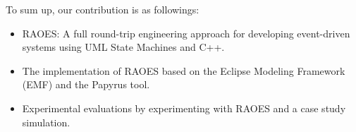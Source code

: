 To sum up, our contribution is as followings:
\begin{itemize}
	\item RAOES: A full round-trip engineering approach for developing event-driven systems using UML State Machines and C++.
	\item The implementation of RAOES based on the Eclipse Modeling Framework (EMF) and the Papyrus tool.
	\item Experimental evaluations by experimenting with RAOES and a case study simulation.
\end{itemize}
